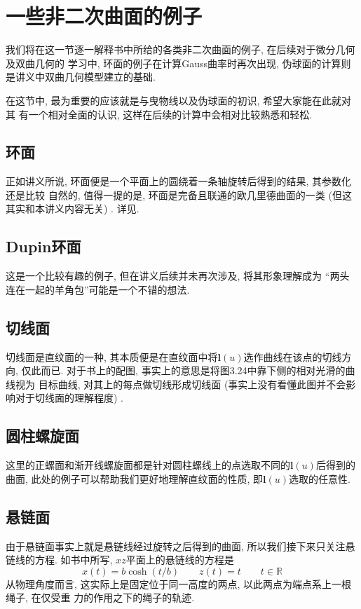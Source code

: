 \documentclass[./main.tex]{subfiles}
\begin{document}
\section{一些非二次曲面的例子}
我们将在这一节逐一解释书中所给的各类非二次曲面的例子, 在后续对于微分几何及双曲几何的
学习中, 环面的例子在计算Gauss曲率时再次出现, 伪球面的计算则是讲义中双曲几何模型建立的基础. 

在这节中, 最为重要的应该就是与曳物线以及伪球面的初识, 希望大家能在此就对其
有一个相对全面的认识, 这样在后续的计算中会相对比较熟悉和轻松. 
\subsection{环面}
正如讲义所说, 环面便是一个平面上的圆绕着一条轴旋转后得到的结果, 其参数化还是比较
自然的, 值得一提的是, 环面是完备且联通的欧几里德曲面的一类 (但这其实和本讲义内容无关) . 详见\cite{gos}.
\subsection{Dupin环面}
这是一个比较有趣的例子, 但在讲义后续并未再次涉及, 将其形象理解成为
``两头连在一起的羊角包''可能是一个不错的想法. 
\subsection{切线面}\label{3.6.3}
切线面是直纹面的一种, 其本质便是在直纹面中将$\mathbf{l}(u)$选作曲线在该点的切线方向, 仅此而已. 对于书上的配图, 事实上的意思是将图3.24中靠下侧的相对光滑的曲线视为
目标曲线, 对其上的每点做切线形成切线面 (事实上没有看懂此图并不会影响对于切线面的理解程度) . 
\subsection{圆柱螺旋面}\label{3.6.4}
这里的正螺面和渐开线螺旋面都是针对圆柱螺线上的点选取不同的$\mathbf{l}(u)$后得到的
曲面, 此处的例子可以帮助我们更好地理解直纹面的性质, 即$\mathbf{l}(u)$选取的任意性. 
\subsection{悬链面}
由于悬链面事实上就是悬链线经过旋转之后得到的曲面, 所以我们接下来只关注悬链线的方程. 
如书中所写, $xz$平面上的悬链线的方程是
\[
x(t)=b\cosh(t/b)\qquad z(t)=t\qquad t\in\mathbb{R}
\]
从物理角度而言, 这实际上是固定位于同一高度的两点, 以此两点为端点系上一根绳子, 在仅受重
力的作用之下的绳子的轨迹. 
\end{document}

